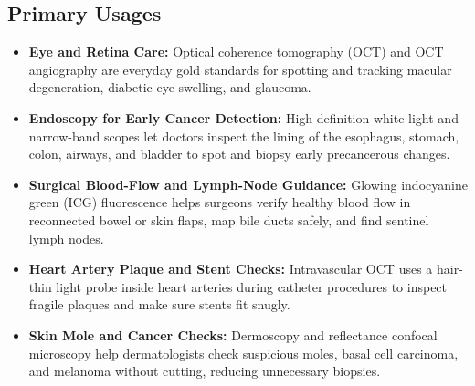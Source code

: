 \subsection{Primary Usages}
\begin{itemize}
  \item \textbf{Eye and Retina Care:} Optical coherence tomography (OCT) and OCT angiography are everyday gold standards for spotting and tracking macular degeneration, diabetic eye swelling, and glaucoma.
  \item \textbf{Endoscopy for Early Cancer Detection:} High-definition white-light and narrow-band scopes let doctors inspect the lining of the esophagus, stomach, colon, airways, and bladder to spot and biopsy early precancerous changes.
  \item \textbf{Surgical Blood-Flow and Lymph-Node Guidance:} Glowing indocyanine green (ICG) fluorescence helps surgeons verify healthy blood flow in reconnected bowel or skin flaps, map bile ducts safely, and find sentinel lymph nodes.
  \item \textbf{Heart Artery Plaque and Stent Checks:} Intravascular OCT uses a hair-thin light probe inside heart arteries during catheter procedures to inspect fragile plaques and make sure stents fit snugly.
  \item \textbf{Skin Mole and Cancer Checks:} Dermoscopy and reflectance confocal microscopy help dermatologists check suspicious moles, basal cell carcinoma, and melanoma without cutting, reducing unnecessary biopsies.
\end{itemize}


